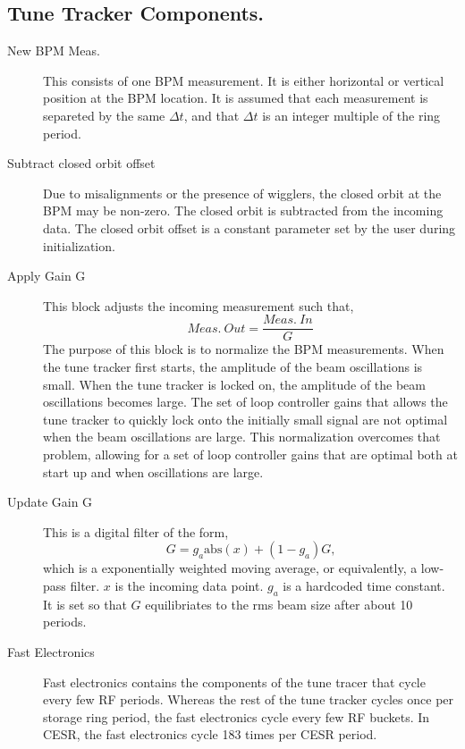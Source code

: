 \subsection{Tune Tracker Components.}
\begin{description}
\item[New BPM Meas.]  This consists of one BPM measurement.  It is either horizontal or vertical
position at the BPM location.  It is assumed that each measurement is separeted by the same $\Delta t$,
and that $\Delta t$ is an integer multiple of the ring period.

\item[Subtract closed orbit offset]  Due to misalignments or the presence of wigglers, the closed orbit
at the BPM may be non-zero.  The closed orbit is subtracted from the incoming data.  The closed orbit
offset is a constant parameter set by the user during initialization.

\item[Apply Gain G]  This block adjusts the incoming measurement such that,
\begin{equation*}
Meas.\ Out = \frac{Meas.\ In}{G}
\end{equation*}
The purpose of this block is to normalize the BPM measurements.  When the tune tracker first starts, the
amplitude of the beam oscillations is small.
When the tune tracker is locked on, the amplitude of the beam oscillations becomes large.
The set of loop controller gains that allows the tune tracker to quickly lock onto the initially small signal
are not optimal when the beam oscillations are large.  This normalization overcomes that problem, allowing
for a set of loop controller gains that are optimal both at start up and when oscillations are large.

\item[Update Gain G]  This is a digital filter of the form,
\begin{equation*}
G = g_a \textrm{abs}\left(x\right) + \left(1-g_a\right)G\textrm{,}
\end{equation*}
which is a exponentially weighted moving average, or equivalently, a low-pass filter.  $x$ is the
incoming data point.  $g_a$ is a hardcoded
time constant.  It is set so that $G$ equilibriates to the rms beam size after about 10 periods.

\item[Fast Electronics]  Fast electronics contains the components of the tune tracer that cycle
every few RF periods.  Whereas the rest of the tune tracker cycles once per storage
ring period, the fast electronics cycle every few RF buckets.  In CESR, the fast electronics
cycle 183 times per CESR period.


\end{description}
